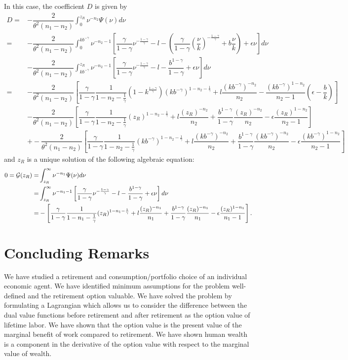\documentclass[a4paper,report, 11pt]{article}
\def\e{\epsilon}
\def\g{\gamma}
\def\n{\nu}
\def\t{\theta}
\begin{document}
{\noindent In this case, the coefficient $D$ is given by 
\begin{align*}
D=&-\dfrac{2}{\t^2(n_1-n_2)}\int_0^{z_R}\nu^{-n_2}\Psi(\nu)d\nu\\
=&-\dfrac{2}{\t^2(n_1-n_2)}\int_0^{kb^{-\g}}\nu^{-n_2-1}\left[\dfrac{\g}{1-\g}\n^{-\frac{1-\g}{\g}}-l-\left(\dfrac{\g}{1-\g}\left(\dfrac{\n}{k}\right)^{-\frac{1-\g}{\g}}+b\dfrac{\n}{k}\right)+\e\n\right]d\nu\\
&-\dfrac{2}{\t^2(n_1-n_2)}\int_{kb^{-\g}}^{z_R}\nu^{-n_2-1}\left[\dfrac{\g}{1-\g}\nu^{-\frac{1-\g}{\g}}-l-\dfrac{b^{1-\g}}{1-\g}+\e\nu\right]d\nu\\
=&-\dfrac{2}{\t^2(n_1-n_2)}\left[\dfrac{\g}{1-\g}\dfrac{1}{1-n_2-\frac{1}{\g}}\left(1-k^{\frac{1-\g}{\g}}\right)(kb^{-\g})^{1-n_2-\frac{1}{\g}}+l\dfrac{(kb^{-\g})^{-n_2}}{n_2}-\dfrac{(kb^{-\g})^{1-n_2}}{n_2-1}\left(\e-\dfrac{b}{k}\right)\right]\\
&-\dfrac{2}{\t^2(n_1-n_2)}\left[\dfrac{\g}{1-\g}\dfrac{1}{1-n_2-\frac{1}{\g}}(z_R)^{1-n_2-\frac{1}{\g}}+l\dfrac{(z_R)^{-n_2}}{n_2}+\dfrac{b^{1-\g}}{1-\g}\dfrac{(z_R)^{-n_2}}{n_2}-\e\dfrac{(z_R)^{1-n_2}}{n_2-1}\right]\\
&+-\dfrac{2}{\t^2(n_1-n_2)}\left[\dfrac{\g}{1-\g}\dfrac{1}{1-n_2-\frac{1}{\g}}(kb^{-\g})^{1-n_2-\frac{1}{\g}}+l\dfrac{(kb^{-\g})^{-n_2}}{n_2}+\dfrac{b^{1-\g}}{1-\g}\dfrac{(kb^{-\g})^{-n_2}}{n_2}-\e\dfrac{(kb^{-\g})^{1-n_2}}{n_2-1}\right]
\end{align*}
and $z_R$ is a unique solution of the following algebraic equation:
\begin{align*}
0={\cal G}(z_R)=&\int_{z_R}^\infty \nu^{-n_1}\Psi(\nu)d\nu\\
=&\int_{z_R}^{\infty}\nu^{-n_1-1}\left[\dfrac{\g}{1-\g}\nu^{-\frac{1-\g}{\g}}-l-\dfrac{b^{1-\g}}{1-\g}+\e\nu\right]d\nu\\
=&-\left[\dfrac{\g}{1-\g}\dfrac{1}{1-n_1-\frac{1}{\g}}(z_R)^{1-n_1-\frac{1}{\g}}+l\dfrac{(z_R)^{-n_1}}{n_1}+\dfrac{b^{1-\g}}{1-\g}\dfrac{(z_R)^{-n_1}}{n_1}-\e\dfrac{(z_R)^{1-n_1}}{n_1-1}\right].
\end{align*}

}

\section{Concluding Remarks}\label{sec:conclusion}

 We have studied a retirement and consumption/portfolio choice of an individual economic agent. We have identified minimum assumptions for the problem well-defined and the retirement option valuable. We have solved the problem by formulating a Lagrangian which allows us to consider the difference between the dual value functions before retirement and after retirement as the option value of lifetime labor. We have shown that the option value is the present value of the marginal benefit of work compared to retirement. We have shown human wealth is a component in the derivative of the option value with respect to the marginal value of wealth.
 
\end{document}

